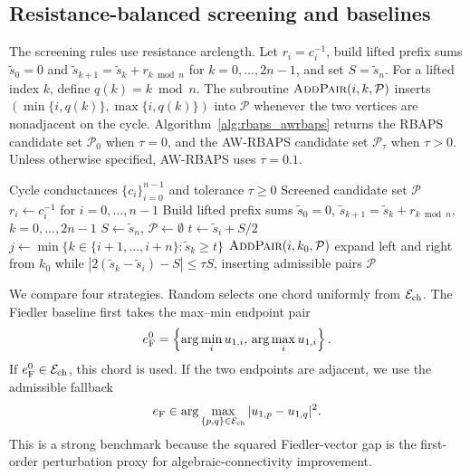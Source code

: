 \documentclass[11pt]{article}
\numberwithin{equation}{section}
\theoremstyle{definition}
\theoremstyle{remark}
\begin{document}
\subsection{Resistance-balanced screening and baselines}

The screening rules use resistance arclength. Let $r_i=c_i^{-1}$, build
lifted prefix sums $\tilde s_0=0$ and
$\tilde s_{k+1}=\tilde s_k+r_{k\bmod n}$ for $k=0,\ldots,2n-1$, and set
$S=\tilde s_n$. For a lifted index $k$, define $q(k)=k\bmod n$. The
subroutine $\textsc{AddPair}(i,k,\mathcal P)$ inserts
$(\min\{i,q(k)\},\max\{i,q(k)\})$ into $\mathcal P$ whenever the two
vertices are nonadjacent on the cycle. Algorithm~\ref{alg:rbaps_awrbaps}
returns the RBAPS candidate set $\mathcal P_0$ when $\tau=0$, and the
AW-RBAPS candidate set $\mathcal P_\tau$ when $\tau>0$. Unless otherwise
specified, AW-RBAPS uses $\tau=0.1$.

\begin{algorithm}[!t]
	\caption{Resistance-balanced screening: RBAPS and AW-RBAPS}
	\label{alg:rbaps_awrbaps}
	\begin{algorithmic}[1]
		\Require Cycle conductances $\{c_i\}_{i=0}^{n-1}$ and tolerance $\tau\ge0$
		\Ensure Screened candidate set $\mathcal P$
		\State $r_i\gets c_i^{-1}$ for $i=0,\ldots,n-1$
		\State Build lifted prefix sums $\tilde s_0=0$,
		$\tilde s_{k+1}=\tilde s_k+r_{k\bmod n}$, $k=0,\ldots,2n-1$
		\State $S\gets\tilde s_n$, $\mathcal P\gets\emptyset$
		\State $t\gets\tilde s_i+S/2$
		\State $j\gets\min\{k\in\{i+1,\ldots,i+n\}:\tilde s_k\ge t\}$
		\State $\textsc{AddPair}(i,k_0,\mathcal P)$
		\State expand left and right from $k_0$ while
		$|2(\tilde s_k-\tilde s_i)-S|\le \tau S$, inserting admissible pairs
		\EndIf
		\EndFor
		\EndFor
		\State \Return $\mathcal P$
	\end{algorithmic}
\end{algorithm}

We compare four strategies. Random selects one chord uniformly from
$\mathcal E_{\rm ch}$. The Fiedler baseline first takes the max--min
endpoint pair
\begin{equation}\label{eq:fiedler_rule_experiment}
	e_{\rm F}^{0}
	=
	\left\{
	\arg\min_i u_{1,i},\,
	\arg\max_i u_{1,i}
	\right\}.
\end{equation}
If $e_{\rm F}^{0}\in\mathcal E_{\rm ch}$, this chord is used. If the two
endpoints are adjacent, we use the admissible fallback
\[
e_{\rm F}\in
\arg\max_{\{p,q\}\in\mathcal E_{\rm ch}}
|u_{1,p}-u_{1,q}|^2 .
\]
This is a strong benchmark because the squared Fiedler-vector gap is the
first-order perturbation proxy for algebraic-connectivity improvement.
\end{document}
